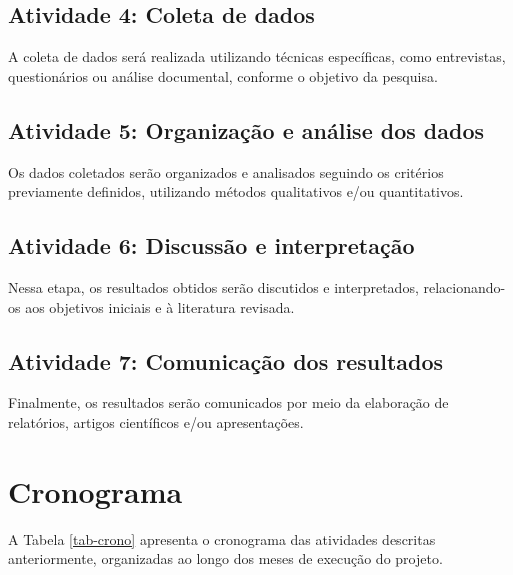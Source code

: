 \subsection{Atividade 4: Coleta de dados}
A coleta de dados será realizada utilizando técnicas específicas, como entrevistas, questionários ou análise documental, conforme o objetivo da pesquisa.

\subsection{Atividade 5: Organização e análise dos dados}
Os dados coletados serão organizados e analisados seguindo os critérios previamente definidos, utilizando métodos qualitativos e/ou quantitativos.

\subsection{Atividade 6: Discussão e interpretação}
Nessa etapa, os resultados obtidos serão discutidos e interpretados, relacionando-os aos objetivos iniciais e à literatura revisada.

\subsection{Atividade 7: Comunicação dos resultados}
Finalmente, os resultados serão comunicados por meio da elaboração de relatórios, artigos científicos e/ou apresentações.

\section{Cronograma}
A Tabela \ref{tab-crono} apresenta o cronograma das atividades descritas anteriormente, organizadas ao longo dos meses de execução do projeto.


